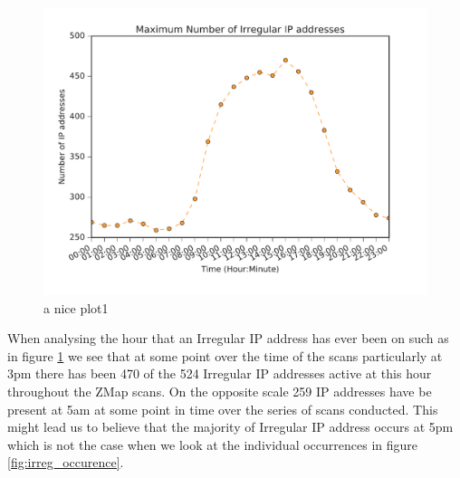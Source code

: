 \documentclass[a4wide,leqno,12pt]{report}
\begin{document}
\begin{figure}[H]
\centering
\includegraphics[scale=.5]{pdf_images/MaximumNumberOfIrregularIPaddressesInAnAverageDay}
\caption{a nice plot1}
\label{fig:irreg_ips}
\end{figure}
When analysing the hour that an Irregular IP address has ever been on such as in figure \ref{fig:irreg_ips} we see that at some point over the time of the scans particularly at 3pm there has been 470 of the 524 Irregular IP addresses active at this hour throughout the ZMap scans. On the opposite scale 259 IP addresses have be present at 5am at some point in time over the series of scans conducted. This might lead us to believe that the majority of Irregular IP address occurs at 5pm which is not the case when we look at the individual occurrences in figure \ref{fig:irreg_occurence}.
\end{document}

